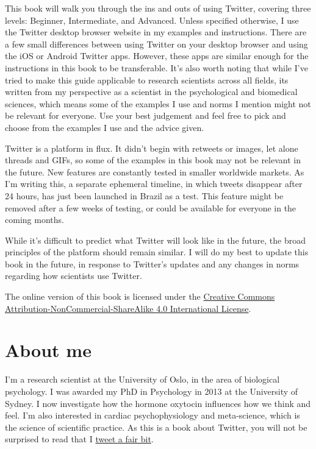\documentclass[]{book}
\begin{document}
This book will walk you through the ins and outs of using Twitter, covering three levels: Beginner, Intermediate, and Advanced. Unless specified otherwise, I use the Twitter desktop browser website in my examples and instructions. There are a few small differences between using Twitter on your desktop browser and using the iOS or Android Twitter apps. However, these apps are similar enough for the instructions in this book to be transferable. It's also worth noting that while I've tried to make this guide applicable to research scientists across all fields, its written from my perspective as a scientist in the psychological and biomedical sciences, which means some of the examples I use and norms I mention might not be relevant for everyone. Use your best judgement and feel free to pick and choose from the examples I use and the advice given.

Twitter is a platform in flux. It didn't begin with retweets or images, let alone threads and GIFs, so some of the examples in this book may not be relevant in the future. New features are constantly tested in smaller worldwide markets. As I'm writing this, a separate ephemeral timeline, in which tweets disappear after 24 hours, has just been launched in Brazil as a test. This feature might be removed after a few weeks of testing, or could be available for everyone in the coming months.

While it's difficult to predict what Twitter will look like in the future, the broad principles of the platform should remain similar. I will do my best to update this book in the future, in response to Twitter's updates and any changes in norms regarding how scientists use Twitter.

The online version of this book is licensed under the \href{https://creativecommons.org/licenses/by-nc-sa/4.0/}{Creative Commons Attribution-NonCommercial-ShareAlike 4.0 International License}.

\hypertarget{about-me}{%
\section*{About me}\label{about-me}}

I'm a research scientist at the University of Oslo, in the area of biological psychology. I was awarded my PhD in Psychology in 2013 at the University of Sydney. I now investigate how the hormone oxytocin influences how we think and feel. I'm also interested in cardiac psychophysiology and meta-science, which is the science of scientific practice. As this is a book about Twitter, you will not be surprised to read that I \href{https://twitter.com/dsquintana}{tweet a fair bit}.
\end{document}
